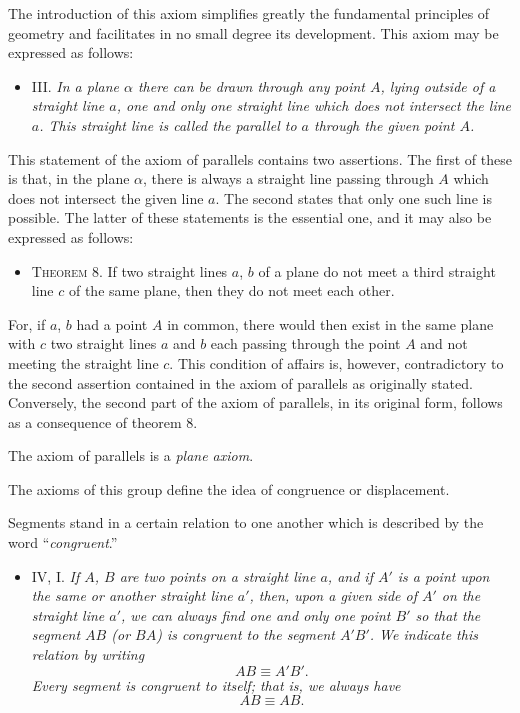\documentclass[11pt,oneside]{book}
\begin{document}
\label{p5}

The introduction of this axiom simplifies greatly
the fundamental principles of geometry and facilitates
in no small degree its development. This axiom may
be expressed as follows:

\begin{itemize}
\item[ ]III\@. \emph{In a plane $\alpha$ there can be drawn through any
point $A$, lying outside of a straight line $a$, one and
only one straight line which does not intersect the
line $a$. This straight line is called the parallel to
$a$ through the given point $A$.}
\end{itemize}

This statement of the axiom of parallels contains
two assertions. The first of these is that, in the plane
$\alpha$, there is always a straight line passing through $A$
which does not intersect the given line $a$. The second
states that only one such line is possible. The latter
of these statements is the essential one, and it may
also be expressed as follows:

\begin{itemize}
\item[]{\scshape Theorem 8.} If two straight lines $a$, $b$ of a plane
do not meet a third straight line $c$ of the same
plane, then they do not meet each other.
\end{itemize}

For, if $a$, $b$ had a point $A$ in common, there would
then exist in the same plane with $c$ two straight lines
$a$ and $b$ each passing through the point $A$ and not
meeting the straight line $c$. This condition of affairs
is, however, contradictory to the second assertion contained
in the axiom of parallels as originally stated.
Conversely, the second part of the axiom of parallels,
in its original form, follows as a consequence of theorem
8.

The axiom of parallels is a \emph{plane axiom}.

\label{p6}

The axioms of this group define the idea of congruence
or displacement.

Segments stand in a certain relation to one another
which is described by the word ``\emph{congruent}.''

\begin{itemize}
\item[ ]IV, I\@. \emph{If $A$, $B$ are two points on a straight line $a$,
and if $A'$ is a point upon the same or another
straight line $a'$, then, upon a given side of $A'$ on
the straight line $a'$, we can always find one and
only one point $B'$ so that the segment $AB$ (or $BA$)
is congruent to the segment $A'B'$. We indicate
this relation by writing }
\[
AB\equiv A'B'.
\]
\emph{Every segment is congruent to itself; that is, we
always have}
\[
AB\equiv AB.
\]
\end{itemize}
\end{document}
